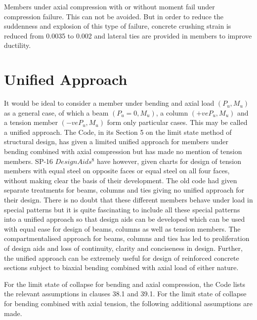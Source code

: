 Members under axial compression with or without moment fail under
compression failure. This can not be avoided. But in order to reduce the
suddenness and explosion of this type of failure, concrete crushing
strain is reduced from 0.0035 to 0.002 and lateral ties are provided
in members to improve ductility.

\section{Unified Approach}

It would be ideal to consider a member under bending and axial load
$(P_u, M_u)$ as a general case, of which a beam $(P_u=0,M_u)$, a column
$(+ve P_u,M_u)$ and a tension member $(-ve P_u,M_u)$ form only particular
cases. This may be called a unified approach. The Code, in its Section 5 on
the limit state method of structural design, has given a limited unified
approach for members under bending combined with axial compression but
has made no mention of tension members. SP-16 $Design Aids^8$ have
however, given charts for design of tension members with equal steel on
opposite faces or equal steel on all four faces, without making clear the
basis of their development. The old code had given separate treatments for
beams, columns and ties giving no unified approach for their design. There
is no doubt that these different members behave under load in special
patterns but it is quite fascinating to include all these special
patterns into a unified approach so that design aids can be developed
which can be used with equal ease for design of beams, columns as well 
as tension members. The compartmentalised approach for beams, columns
and ties has led to proliferation of design aids and loss of continuity,
clarity and conciseness in design. Further, the unified approach can be
extremely useful for design of reinforced concrete sections subject to
biaxial bending combined with axial load of either nature.

For the limit state of collapse for bending and axial compression, the
Code lists the relevant assumptions in clauses 38.1 and 39.1. For the
limit state of collapse for bending combined with axial tension, the
following additional assumptions are made.

